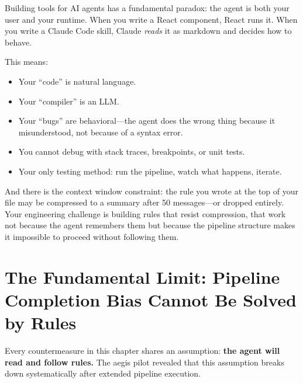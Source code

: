 \documentclass[11pt,a4paper,openright,twoside]{report}
\begin{document}
Building tools for AI agents has a fundamental paradox: the agent is both your user and your runtime. When you write a React component, React runs it. When you write a Claude Code skill, Claude \emph{reads} it as markdown and decides how to behave.

This means:
\begin{itemize}
  \item Your ``code'' is natural language.
  \item Your ``compiler'' is an LLM.
  \item Your ``bugs'' are behavioral---the agent does the wrong thing because it misunderstood, not because of a syntax error.
  \item You cannot debug with stack traces, breakpoints, or unit tests.
  \item Your only testing method: run the pipeline, watch what happens, iterate.
\end{itemize}

And there is the context window constraint: the rule you wrote at the top of your file may be compressed to a summary after 50 messages---or dropped entirely. Your engineering challenge is building rules that resist compression, that work not because the agent remembers them but because the pipeline structure makes it impossible to proceed without following them.

\section{The Fundamental Limit: Pipeline Completion Bias Cannot Be Solved by Rules}

Every countermeasure in this chapter shares an assumption: \textbf{the agent will read and follow rules.} The aegis pilot revealed that this assumption breaks down systematically after extended pipeline execution.
\end{document}
